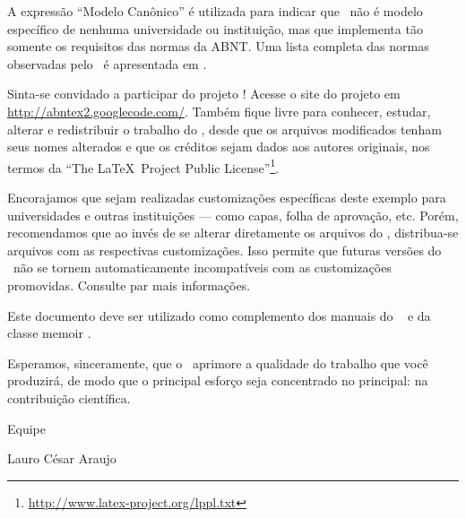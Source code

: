 A expressão ``Modelo Canônico'' é utilizada para indicar que \abnTeX\ não é
modelo específico de nenhuma universidade ou instituição, mas que implementa tão
somente os requisitos das normas da ABNT. Uma lista completa das normas
observadas pelo \abnTeX\ é apresentada em .

Sinta-se convidado a participar do projeto \abnTeX! Acesse o site do projeto em
\url{http://abntex2.googlecode.com/}. Também fique livre para conhecer,
estudar, alterar e redistribuir o trabalho do \abnTeX, desde que os arquivos
modificados tenham seus nomes alterados e que os créditos sejam dados aos
autores originais, nos termos da ``The \LaTeX\ Project Public
License''\footnote{\url{http://www.latex-project.org/lppl.txt}}.

Encorajamos que sejam realizadas customizações específicas deste exemplo para
universidades e outras instituições --- como capas, folha de aprovação, etc.
Porém, recomendamos que ao invés de se alterar diretamente os arquivos do
\abnTeX, distribua-se arquivos com as respectivas customizações.
Isso permite que futuras versões do \abnTeX~não se tornem automaticamente
incompatíveis com as customizações promovidas. Consulte
 par mais informações.

Este documento deve ser utilizado como complemento dos manuais do \abnTeX\ 
\cite{abntex2classe,abntex2cite,abntex2cite-alf} e da classe \textsf{memoir}
\cite{memoir}. 

Esperamos, sinceramente, que o \abnTeX\ aprimore a qualidade do trabalho que
você produzirá, de modo que o principal esforço seja concentrado no principal:
na contribuição científica.

Equipe \abnTeX 

Lauro César Araujo


